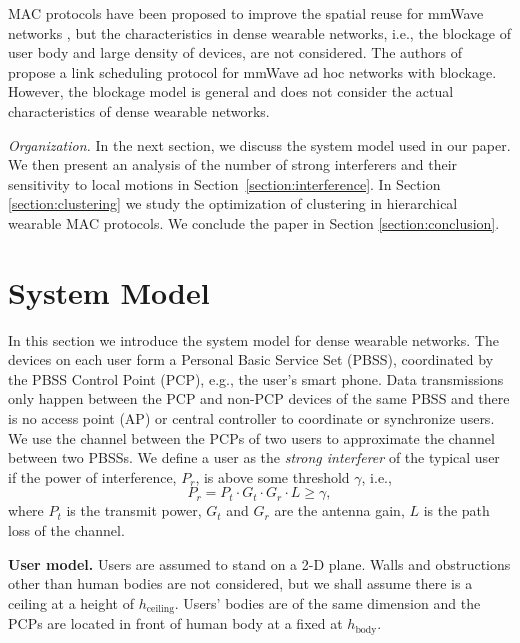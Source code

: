 \documentclass[10pt, conference, letterpaper]{IEEEtran}
\begin{document}
MAC protocols have been proposed to improve the spatial reuse for mmWave networks \cite{dtdmac}\cite{mdmac}\cite{intersharing}, but the characteristics in dense wearable networks, i.e., the blockage of user body and large density of devices, are not considered.
The authors of \cite{onlinkscheduling} propose a link scheduling protocol for mmWave ad hoc networks with blockage. However, the blockage model is general and does not consider the actual characteristics of dense wearable networks.

\emph{Organization.}
In the next section, we discuss the system model used in our paper. 
We then present an analysis of the number of strong interferers and their sensitivity to local motions in Section~\ref{section:interference}. 
In Section \ref{section:clustering} we study the optimization of clustering in hierarchical wearable MAC protocols.
We conclude the paper in Section \ref{section:conclusion}.

\section{System Model}
In this section we introduce the system model for dense wearable networks. 
The devices on each user form a Personal Basic Service Set (PBSS), coordinated by the PBSS Control Point (PCP), e.g., the user's smart phone.
Data transmissions only happen between the PCP and non-PCP devices of the same PBSS and there is no access point (AP) or central controller to coordinate or synchronize users. 
We use the channel between the PCPs of two users to approximate the channel between two PBSSs. 
We define a user as the \emph{strong interferer} of the typical user if the power of interference, $P_r$, is above some threshold $\gamma$, i.e., 
\begin{equation*}
P_r = P_t\cdot G_t\cdot G_r\cdot L \geq \gamma, 
\end{equation*}
where $P_t$ is the transmit power, $G_t$ and $G_r$ are the antenna gain, $L$ is the path loss of the channel.

\textbf{User model.} Users are assumed to stand on a 2-D plane. 
Walls and obstructions other than human bodies are not considered, but we shall assume there is a ceiling at a height of $h_{\mathrm{ceiling}}$. 
Users' bodies are of the same dimension and the PCPs are located in front of human body at a fixed at $h_{\mathrm{body}}$. 
\end{document}
